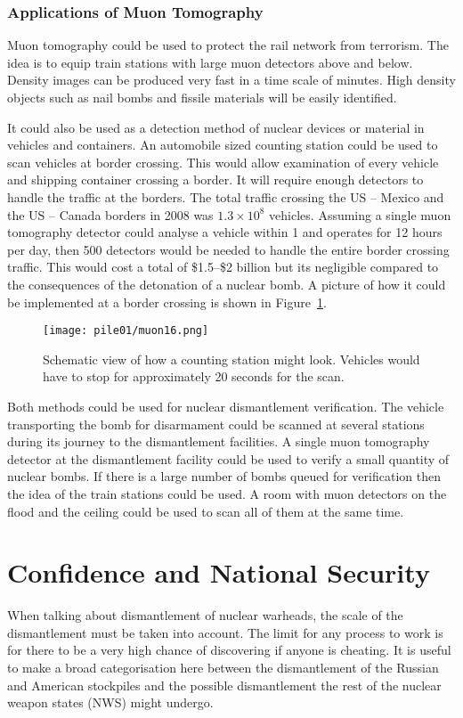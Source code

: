 \documentclass[twoside,titlepage,11pt,twocolumn,a4paper]{article}
\begin{document}
\subsubsection{Applications of Muon Tomography}
Muon tomography could be used to protect the rail network from
terrorism. The idea is to equip train stations with large muon
detectors above and below. Density images can be produced very fast in
a time scale of minutes. High density objects such as nail bombs and
fissile materials will be easily identified. \citep{nichol}

It could also be used as a detection method of nuclear devices or
material in vehicles and containers.  An automobile sized counting
station could be used to scan vehicles at border crossing. This would
allow examination of every vehicle and shipping container crossing a
border. It will require enough detectors to handle the traffic at the
borders. The total traffic crossing the US -- Mexico and the US --
Canada borders in 2008 was \(1.3\times10^8\) vehicles. Assuming a
single muon tomography detector could analyse a vehicle within
\unit{1}{\minute} and operates for 12 hours per day, then 500
detectors would be needed to handle the entire border crossing
traffic. This would cost a total of \$1.5--\$2 billion but its
negligible compared to the consequences of the detonation of a nuclear
bomb. A picture of how it could be implemented at a border crossing is
shown in Figure~\ref{fig:muon16}. \citep{morris2008}

\begin{figure}
  \texttt{[image: pile01/muon16.png]}
  \caption{Schematic view of how a counting station might
    look. Vehicles would have to stop for approximately 20 seconds for
    the scan. \citep{morris2008}}
  \label{fig:muon16}
\end{figure}

Both methods could be used for nuclear dismantlement verification. The
vehicle transporting the bomb for disarmament could be scanned at
several stations during its journey to the dismantlement facilities. A
single muon tomography detector at the dismantlement facility could be
used to verify a small quantity of nuclear bombs. If there is a large
number of bombs queued for verification then the idea of the train
stations could be used. A room with muon detectors on the flood and
the ceiling could be used to scan all of them at the same time.

\section{Confidence and National Security}
When talking about dismantlement of nuclear warheads, the scale of the
dismantlement must be taken into account. The limit for any process to
work is for there to be a very high chance of discovering if anyone is
cheating. It is useful to make a broad categorisation here between the
dismantlement of the Russian and American stockpiles and the possible
dismantlement the rest of the nuclear weapon states (NWS) might
undergo.
\end{document}

